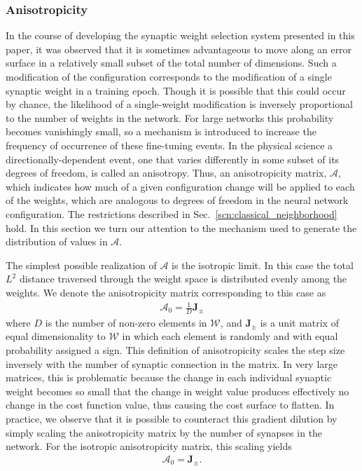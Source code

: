 \documentclass[10pt,journal,cspaper,compsoc]{IEEEtran}
\begin{document}
\subsubsection{Anisotropicity}
\label{scn:anisotropicity}
In the course of developing the synaptic weight selection system presented in this paper, it was observed that it is sometimes advantageous to move along an error surface in a relatively small subset of the total number of dimensions. Such a modification of the configuration corresponds to the modification of a single synaptic weight in a training epoch. Though it is possible that this could occur by chance, the likelihood of a single-weight modification is inversely proportional to the number of weights in the network. For large networks this probability becomes vanishingly small, so a mechanism is introduced to increase the frequency of occurrence of these fine-tuning events. In the physical science a directionally-dependent event, one that varies differently in some subset of its degrees of freedom, is called an anisotropy. Thus, an anisotropicity matrix, $\boldsymbol{\mathcal{A}}$, which indicates how much of a given configuration change will be applied to each of the weights, which are analogous to degrees of freedom in the neural network configuration. The restrictions described in Sec.~\ref{scn:classical_neighborhood} hold. In this section we turn our attention to the mechanism used to generate the distribution of values in $\boldsymbol{\mathcal{A}}$. 

The simplest possible realization of $\boldsymbol{\mathcal{A}}$ is the isotropic limit. In this case the total $L^2$ distance traversed through the weight space is distributed evenly among the weights. We denote the anisotropicity matrix corresponding to this case as
\begin{align}\label{eq:isotropic_anisotropicity}
\boldsymbol{\mathcal{A}}_0 = \frac{1}{D}  \boldsymbol{J}_{\pm}
\end{align}
\noindent where $D$ is the number of non-zero elements in $\boldsymbol{\mathcal{W}}$, and $\boldsymbol{J}_{\pm}$ is a unit matrix of equal dimensionality to $\boldsymbol{\mathcal{W}}$ in which each element is randomly and with equal probability assigned a sign. This definition of anisotropicity scales the step size inversely with the number of synaptic connection in the matrix. In very large matrices, this is problematic because the change in each individual synaptic weight becomes so small that the change in weight value produces effectively no change in the cost function value, thus causing the cost surface to flatten. In practice, we observe that it is possible to counteract this gradient dilution by simply scaling the anisotropicity matrix by the number of synapses in the network. For the isotropic anisotropicity matrix, this scaling yields
\begin{align}\label{eq:isotropic_anisotropicity_scaled}
\boldsymbol{\mathcal{A}}_0 =  \boldsymbol{J}_{\pm}.
\end{align} 
\end{document}
